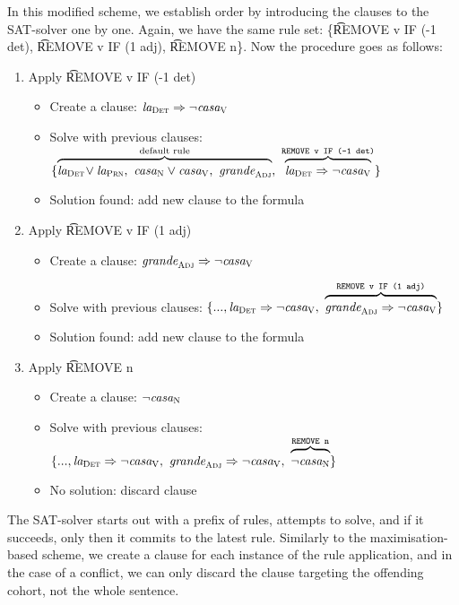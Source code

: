 In this modified scheme, we establish order by introducing the clauses to the SAT-solver one by one. 
Again, we have the same rule set: \{\t{REMOVE v IF (-1 det)}, \t{REMOVE v IF (1 adj)}, \t{REMOVE n}\}. Now the procedure goes as follows:

\begin{enumerate}
\item Apply \t{REMOVE v IF (-1 det)}
 \begin{itemize}
    \item Create a clause: $\text{\em la}_{\text{\sc Det}} \Rightarrow \neg \text{\em casa}_{\text{\sc V}}$
    \item Solve with previous clauses:
  $\{ \ob{\laDet \! \vee \laPrn, \ \casaN \vee \casaV, \  \grandeAdj}^{\text{default rule}}, \ 
      \ob{\laDet \Rightarrow \neg \casaV}^{\t{REMOVE v IF (-1 det)}} \}$
    \item Solution found: add new clause to the formula
 \end{itemize}
\item Apply \t{REMOVE v IF (1 adj)} 
 \begin{itemize}
    \item Create a clause: $\text{\em grande}_{\text{\sc Adj}} \Rightarrow \neg \text{\em casa}_{\text{\sc V}}$
    \item Solve with previous clauses:
  $\{..., \laDet \Rightarrow \neg \casaV, \ 
      \ob{\grandeAdj \Rightarrow \neg \casaV}^{\t{REMOVE v IF (1 adj)}}  \}$
    \item Solution found: add new clause to the formula
 \end{itemize}
\item Apply \t{REMOVE n}
 \begin{itemize}
    \item Create a clause: $\neg \text{\em casa}_{\text{\sc N}}$
    \item Solve with previous clauses:
      $\{ ..., \laDet \Rightarrow \neg \casaV, \ 
      \grandeAdj \Rightarrow \neg \casaV, \ 
      \ob{\neg \casaN}^{\t{REMOVE n}} \}$
    \item No solution: discard clause
 \end{itemize}
\end{enumerate}

The SAT-solver starts out with a prefix of rules, attempts to solve, and if it succeeds, only then it commits to the latest rule.
Similarly to the maximisation-based scheme, we create a clause for each instance of the rule application, and in the case of a conflict, we can only discard the clause targeting the offending cohort, not the whole sentence.



